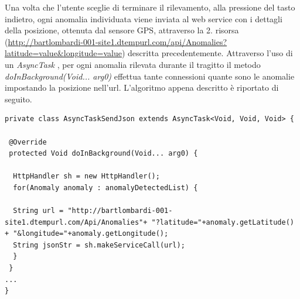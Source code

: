\documentclass[a4paper, 11pt]{article} %
\begin{document}
Una volta che l'utente sceglie di terminare il rilevamento, alla pressione del tasto indietro, ogni anomalia individuata viene inviata al web service con i dettagli della posizione, ottenuta dal sensore GPS, attraverso la 2. risorsa (\url{http://bartlombardi-001-site1.dtempurl.com/api/Anomalies?latitude=value\&longitude=value}) descritta precedentemente.
Attraverso l'uso di un \textit{AsyncTask} , per ogni anomalia rilevata durante il tragitto il metodo \textit{doInBackground(Void... arg0)} effettua tante connessioni quante sono le anomalie impostando la posizione nell'url. L'algoritmo appena descritto è riportato di seguito.\\

\begin{lstlisting}
private class AsyncTaskSendJson extends AsyncTask<Void, Void, Void> {

 @Override
 protected Void doInBackground(Void... arg0) {

  HttpHandler sh = new HttpHandler();
  for(Anomaly anomaly : anomalyDetectedList) {

  String url = "http://bartlombardi-001-site1.dtempurl.com/Api/Anomalies"+ "?latitude="+anomaly.getLatitude() + "&longitude="+anomaly.getLongitude();
  String jsonStr = sh.makeServiceCall(url);
  }  
 }
...
}
\end{lstlisting}
\newpage
\end{document}
